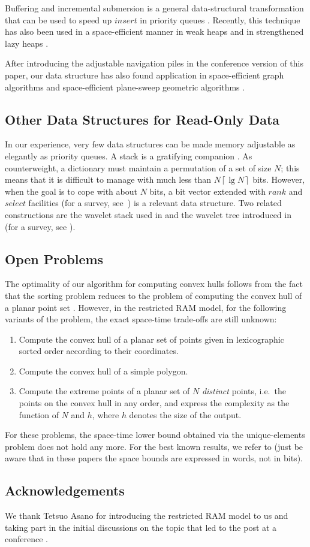 \documentclass[final,onetabnum,onefignum,onethmnum]{siamltex}
\newcommand{\Insert}{\mbox{$\mathit{insert}$}}
\newcommand{\ceils}[1]{\left\lceil #1 \right\rceil}
\newcommand{\Rank}{\mbox{$\mathit{rank}$}}
\newcommand{\Select}{\mbox{$\mathit{select}$}}
\begin{document}
Buffering and incremental submersion is a general data-structural
transformation that can be used to speed up \Insert{} in priority
queues \cite{AHRT05}.  Recently, this technique has also been used in a
space-efficient manner in weak heaps \cite{EEK13} and in strengthened
lazy heaps \cite{EEK15}.

After introducing the adjustable navigation piles in the conference version of this paper, 
our data structure has also found application in space-efficient graph algorithms
\cite{EHK15} and space-efficient plane-sweep geometric algorithms \cite{EK15}.

\subsection{Other Data Structures for Read-Only Data} 
In our experience, very few data structures can be made memory
adjustable as elegantly as priority queues. A stack is a gratifying
companion \cite{BKLSS15}.  As counterweight, a dictionary must maintain a
permutation of a set of size $N$; this means that it is difficult to
manage with much less than $N \ceils{\lg{N}}$ bits. However, when the
goal is to cope with about $N$ bits, a bit vector extended with \Rank{}
and \Select{} facilities (for a survey, see~\cite{NP12}) is a
relevant data structure.  Two related constructions are the wavelet
stack used in \cite{EJKS14} and the wavelet tree introduced in
\cite{GGV03} (for a survey, see \cite{Nav12}).

\subsection{Open Problems}

The optimality of our algorithm for computing convex hulls follows
from the fact that the sorting problem reduces to the problem of
computing the convex hull of a planar point set \cite[Section
  3.2]{PS85}. However, in the restricted RAM model, for the following
variants of the problem, the exact space-time trade-offs are still
unknown:
\begin{enumerate}
\item Compute the convex hull of a planar set of points given in
  lexicographic sorted order according to their coordinates.
\item Compute the convex hull of a simple polygon. 
\item Compute the extreme points of a planar set of $N$ \emph{distinct} points,
  i.e.~the points on the convex hull in any order, and express the
  complexity as the function of $N$ and $h$, where $h$ denotes the
  size of the output.
\end{enumerate}
For these problems, the space-time lower bound obtained via the
unique-elements problem \cite[Section 10.13.7]{Sav08} does not hold any more.
For the best known results, we refer to \cite{BKLSS15,CC07} (just be
aware that in these papers the space bounds are expressed in words,
not in bits).


\subsection*{Acknowledgements}

We thank Tetsuo Asano for introducing the restricted RAM model to us
and taking part in the initial discussions on the topic that led to
the post at a conference \cite{AEK13}.



\end{document}

